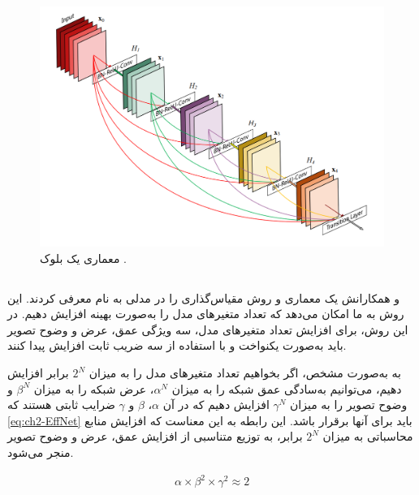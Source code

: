 \begin{figure}[h]
    \centering
    \includegraphics[width=1\textwidth]{Images/Chapter2/DenseNet.PNG}
    \caption{معماری یک بلوک
     \cite{huang2017densely}.}
    \label{fig:densenet_architecture}
\end{figure}






\subsection{}

\cite{tan2019efficientnet} 
 و همکارانش یک معماری و روش مقیاس‌گذاری را در مدلی به نام 
  معرفی کردند. این روش به ما امکان می‌دهد که تعداد متغیرهای مدل را به‌صورت بهینه افزایش دهیم. در این روش، برای افزایش تعداد متغیرهای مدل، سه ویژگی عمق، عرض و وضوح
  تصویر باید به‌صورت یکنواخت و با استفاده از سه ضریب ثابت افزایش پیدا کنند.

به به‌صورت مشخص، اگر بخواهیم تعداد متغیر‌های مدل را به میزان \(2^N\) برابر افزایش دهیم، می‌توانیم به‌سادگی عمق شبکه را به میزان \( \alpha^N \)، عرض شبکه را به میزان \( \beta^N \) و وضوح تصویر را به میزان \( \gamma^N \) افزایش دهیم که در آن \(\alpha\)، \(\beta\) و \(\gamma\) ضرایب ثابتی هستند که 
\autoref{eq:ch2-EffNet}
باید برای آنها برقرار باشد. این رابطه به این معناست که افزایش منابع محاسباتی به میزان \(2^N\) برابر، به توزیع متناسبی از افزایش عمق، عرض و وضوح تصویر منجر می‌شود. 

 
\begin{latin}
\begin{equation}
\label{eq:ch2-EffNet}
\begin{aligned}
\alpha \times \beta^2 \times \gamma^2 \approx 2
\end{aligned}
\end{equation}
\end{latin}

